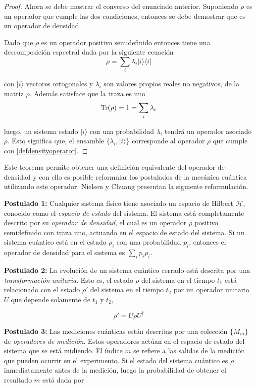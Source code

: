 \begin{proof}
Ahora se debe mostrar el converso del enunciado anterior. Suponiendo $\rho$ es un operador que cumple las dos condiciones, entonces se debe demostrar que es un operador de densidad.

Dado que $\rho$ es un operador positivo semidefinido entonces tiene una descomposición espectral dada por la siguiente ecuación {\cite{nielsen_chuang_2010}}
\[\rho=\sum_i \lambda_i |i\rangle \langle i|\]

con $|i\rangle$ vectores ortogonales y $\lambda_i$ son valores propios reales no negativos, de la matriz $\rho$. Además satisface que la traza es uno 
\[{\rm Tr}(\rho)=1=\sum_i\lambda_i\]

luego, un sistema estado $|i\rangle$ con una probabilidad $\lambda_i$ tendrá un operador asociado $\rho$. Esto significa que, el ensamble $\{\lambda_i, |i\rangle\}$  corresponde al operador $\rho$ que cumple con {\ref{defdensityoperator}}.


\end{proof}



Este teorema  permite obtener una definición equivalente del operador de densidad y con ello es posible reformular los postulados de la mecánica cuántica utilizando este operador. Nielsen y Chuang {\cite{nielsen_chuang_2010}} presentan la siguiente reformulación.


\setlength{\leftskip}{1cm}

 \textbf{Postulado 1:} Cualquier sistema físico tiene asociado un espacio de Hilbert $\mathcal{H}$, conocido como el \textit{espacio de estado} del sistema. El sistema está completamente descrito por su \textit{operador de densidad}, el cual es un operador $\rho$ positivo semidefinido con traza uno, actuando en el espacio de estado del sistema. Si un sistema cuántico está en el estado $\rho_i$ con una probabilidad $p_i$, entonces el operador de densidad para el sistema es $\sum_{i}p_i\rho_i$.


\textbf{Postulado 2:} La evolución de un sistema cuántico cerrado está descrita por una \textit{transformación unitaria}. Esto es, el estado $\rho$ del sistema en el tiempo $t_1$ está relacionado con el estado $\rho'$ del sistema en el tiempo $t_2$ por un operador unitario $U$ que depende solamente de $t_1$ y $t_2$, 

\begin{equation}\label{postulado 2}
\rho'=U\rho U^{\dagger}
\end{equation}


\textbf{Postulado 3:} Las mediciones cuánticas están descritas por una colección $\{M_m\}$ de \textit{operadores de medición}. Estos operadores actúan en el espacio de estado del sistema que se está midiendo. El índice $m$ se refiere a las salidas de la medición que pueden ocurrir en el experimento. Si el estado del sistema cuántico es $\rho$ inmediatamente antes de la medición, luego la probabilidad de obtener el resultado $m$ está dada por

